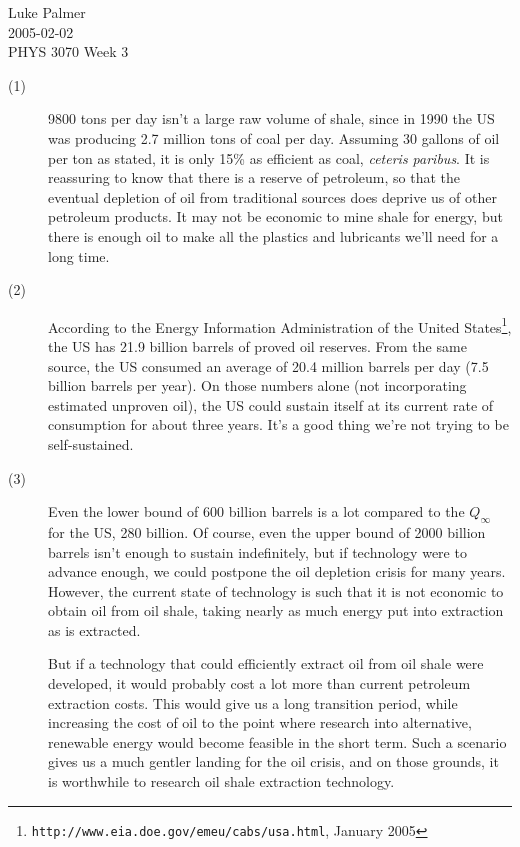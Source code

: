 \documentclass[12pt]{article}
\begin{document}
\noindent Luke Palmer \\
2005-02-02 \\
PHYS 3070 Week 3 \\

\begin{description}

\item[(1)] 9800 tons per day isn't a large raw volume of shale, since in
1990 the US was producing 2.7 million tons of coal per day.  Assuming 30
gallons of oil per ton as stated, it is only 15\% as efficient as coal,
\textit{ceteris paribus}.  It is reassuring to know that there is a
reserve of petroleum, so that the eventual depletion of oil from
traditional sources does deprive us of other petroleum products.  It may
not be economic to mine shale for energy, but there is enough oil to
make all the plastics and lubricants we'll need for a long time.

\item[(2)] According to the Energy Information Administration of the
United States\footnote{\texttt{http://www.eia.doe.gov/emeu/cabs/usa.html},
January 2005}, the US has 21.9 billion barrels of proved oil reserves.
From the same source, the US consumed an average of 20.4 million barrels
per day (7.5 billion barrels per year).  On those numbers alone (not
incorporating estimated unproven oil), the US could sustain itself at
its current rate of consumption for about three years.  It's a good
thing we're not trying to be self-sustained.

\item[(3)] Even the lower bound of 600 billion barrels is a lot compared
to the $Q_\infty$ for the US, 280 billion.  Of course, even the upper
bound of 2000 billion barrels isn't enough to sustain indefinitely, but
if technology were to advance enough, we could postpone the oil
depletion crisis for many years.  However, the current state of
technology is such that it is not economic to obtain oil from oil shale,
taking nearly as much energy put into extraction as is extracted.

But if a technology that could efficiently extract oil from oil shale
were developed, it would probably cost a lot more than current petroleum
extraction costs.  This would give us a long transition period, while
increasing the cost of oil to the point where research into alternative,
renewable energy would become feasible in the short term.  Such a
scenario gives us a much gentler landing for the oil crisis, and on
those grounds, it is worthwhile to research oil shale extraction
technology.

\end{description}
\end{document}
